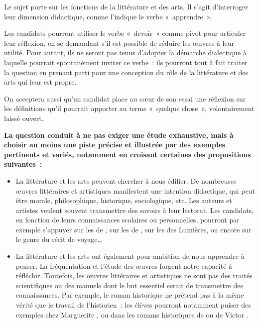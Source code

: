 		{Le sujet porte sur les fonctions de la littérature et des arts. Il s'agit d'interroger
leur dimension didactique, comme l'indique le verbe «~apprendre~».

Les candidats pourront utiliser le verbe «~devoir~» comme pivot pour articuler
leur réflexion, en se demandant s'il est possible de réduire les œuvres à leur utilité.
Pour autant, ils ne seront pas tenus d'adopter la démarche dialectique à laquelle
pourrait spontanément inviter ce verbe~: ils pourront tout à fait traiter la question en
prenant parti pour une conception du rôle de la littérature et des arts qui leur est propre.

On acceptera aussi qu'un candidat place au cœur de son essai une réflexion
sur les définitions qu'il pourrait apporter au terme «~quelque chose~», volontairement
laissé ouvert.

\textbf{La question conduit à ne pas exiger une étude exhaustive, mais à choisir au
moins une piste précise et illustrée par des exemples pertinents et variés,
notamment en croisant certaines des propositions suivantes~:}

\begin{itemize}
\item La littérature et les arts peuvent chercher à nous édifier. De nombreuses
œuvres littéraires et artistiques manifestent une intention didactique, qui peut être
morale, philosophique, historique, sociologique, etc. Les auteurs et artistes veulent
souvent transmettre des savoirs à leur lectorat. Les candidats, en fonction de leurs
connaissances scolaires ou personnelles, pourront par exemple s'appuyer sur les
 de , sur les  de , sur les 
des Lumières, ou encore sur le genre du récit de voyage…

\item La littérature et les arts ont également pour ambition de nous apprendre à
penser. La fréquentation et l'étude des œuvres forgent notre capacité à réfléchir.
Toutefois, les œuvres littéraires et artistiques ne sont pas des traités scientifiques ou
des manuels dont le but essentiel serait de transmettre des connaissances. Par
exemple, le roman historique ne prétend pas à la même vérité que le travail de
l'historien~: les élèves pourront notamment puiser des exemples chez
Marguerite , ou dans les romans historiques de  ou de Victor .


\end{itemize}}
